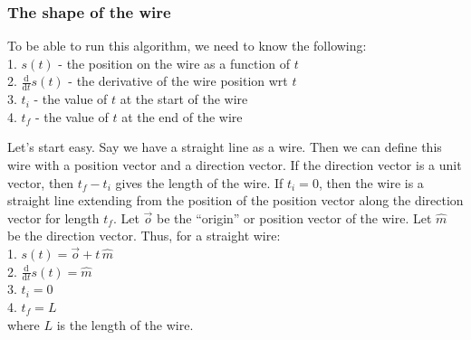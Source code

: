 \documentclass[12pt]{article}
\newcommand{\spaces}{\phantom{\qquad}}
\newcommand{\diff}{\frac{\mathrm{d}}{\mathrm{d}t}}
\begin{document}
	\subsubsection*{The shape of the wire}
		
	To be able to run this algorithm, we need to know the following: \\
		\spaces 1. $s(t)$ - the position on the wire as a function of $t$ \\
		\spaces 2. $\diff s(t) $ - the derivative of the wire position wrt $t$ \\
		\spaces 3. $t_i$ - the value of $t$ at the start of the wire \\
		\spaces 4. $t_f$ - the value of $t$ at the end of the wire
		
	Let's start easy. Say we have a straight line as a wire. Then we can define this wire with a position vector and a direction vector. If the direction vector is a unit vector, then $t_f - t_i$ gives the length of the wire. If $t_i = 0$, then the wire is a straight line extending from the position of the position vector along the direction vector for length $t_f$. Let $\vec{o}$ be the ``origin'' or position vector of the wire. Let $\hat{m}$ be the direction vector. Thus, for a straight wire: \\
		\spaces 1. $s(t) = \vec{o} + t\,\hat{m}$  \\
		\spaces 2. $\diff s(t) = \hat{m}$ \\
		\spaces 3. $t_i = 0$ \\
		\spaces 4. $t_f = L$ \\
	where $L$ is the length of the wire.
	
\end{document}
